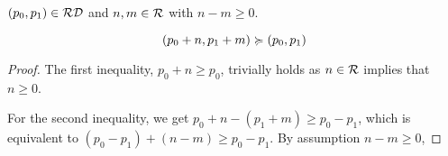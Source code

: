 \begin{lemma}\label{lemma:pos-relaxation}
   \((p_0, p_1) \in \mathcal{RD}\) and \(n, m \in \mathcal{R}\) with \(n - m \geq 0\).

   \[
      (p_0 + n, p_1 + m) \succcurlyeq (p_0, p_1)
   \]
\end{lemma}

\begin{proof}
   The first inequality, \(p_0 + n \geq p_0\), trivially holds as \(n \in \mathcal{R}\) implies that \(n \geq 0\). 

   For the second inequality, we get \(p_0 + n - (p_1 + m) \geq p_0 - p_1\), which is equivalent to \((p_0 - p_1) + (n - m) \geq p_0 - p_1\). By assumption \(n - m \geq 0\), 
\end{proof}

